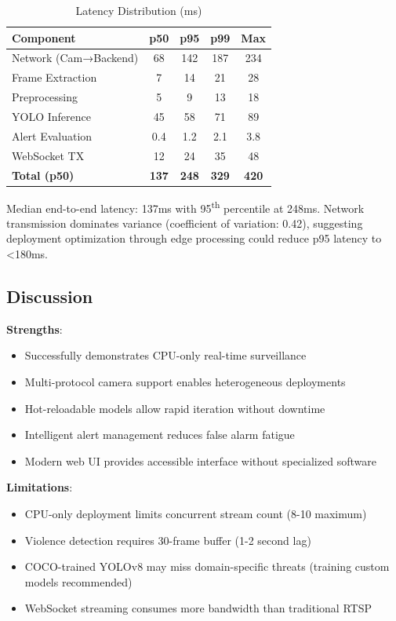 \documentclass[conference]{IEEEtran}
\begin{document}
\begin{table}[htbp]
\caption{Latency Distribution (ms)}
\begin{center}
\begin{tabular}{|l|c|c|c|c|}
\hline
\textbf{Component} & \textbf{p50} & \textbf{p95} & \textbf{p99} & \textbf{Max} \\
\hline
Network (Cam→Backend) & 68 & 142 & 187 & 234 \\
\hline
Frame Extraction & 7 & 14 & 21 & 28 \\
\hline
Preprocessing & 5 & 9 & 13 & 18 \\
\hline
YOLO Inference & 45 & 58 & 71 & 89 \\
\hline
Alert Evaluation & 0.4 & 1.2 & 2.1 & 3.8 \\
\hline
WebSocket TX & 12 & 24 & 35 & 48 \\
\hline
\textbf{Total (p50)} & \textbf{137} & \textbf{248} & \textbf{329} & \textbf{420} \\
\hline
\end{tabular}
\label{tab:latency-dist}
\end{center}
\end{table}

Median end-to-end latency: 137ms with 95\textsuperscript{th} percentile at 248ms. Network transmission dominates variance (coefficient of variation: 0.42), suggesting deployment optimization through edge processing could reduce p95 latency to <180ms.

\subsection{Discussion}
\textbf{Strengths}:
\begin{itemize}
    \item Successfully demonstrates CPU-only real-time surveillance
    \item Multi-protocol camera support enables heterogeneous deployments
    \item Hot-reloadable models allow rapid iteration without downtime
    \item Intelligent alert management reduces false alarm fatigue
    \item Modern web UI provides accessible interface without specialized software
\end{itemize}

\textbf{Limitations}:
\begin{itemize}
    \item CPU-only deployment limits concurrent stream count (8-10 maximum)
    \item Violence detection requires 30-frame buffer (1-2 second lag)
    \item COCO-trained YOLOv8 may miss domain-specific threats (training custom models recommended)
    \item WebSocket streaming consumes more bandwidth than traditional RTSP
\end{itemize}
\end{document}
